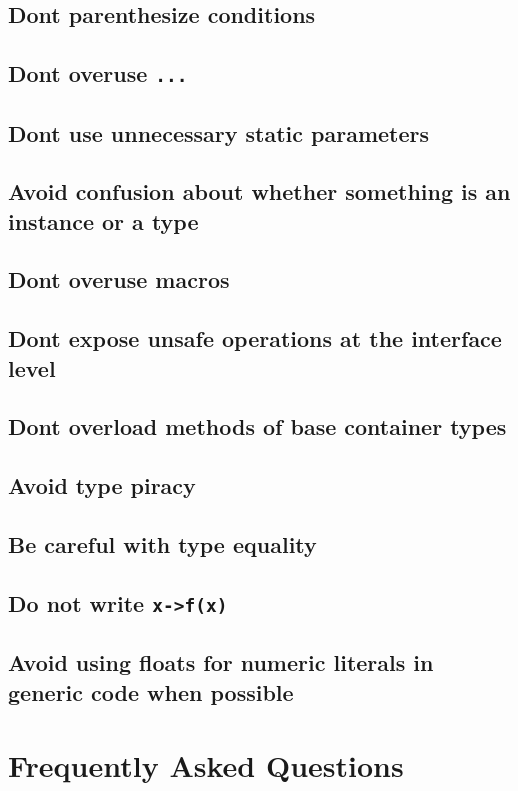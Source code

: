     \section{Don{\textquotesingle}t parenthesize conditions}
    \section{Don{\textquotesingle}t overuse \texttt{...}}
    \section{Don{\textquotesingle}t use unnecessary static parameters}
    \section{Avoid confusion about whether something is an instance or a type}
    \section{Don{\textquotesingle}t overuse macros}
    \section{Don{\textquotesingle}t expose unsafe operations at the interface level}
    \section{Don{\textquotesingle}t overload methods of base container types}
    \section{Avoid type piracy}
    \section{Be careful with type equality}
    \section{Do not write \texttt{x->f(x)}}
    \section{Avoid using floats for numeric literals in generic code when possible}
  \chapter{Frequently Asked Questions}
